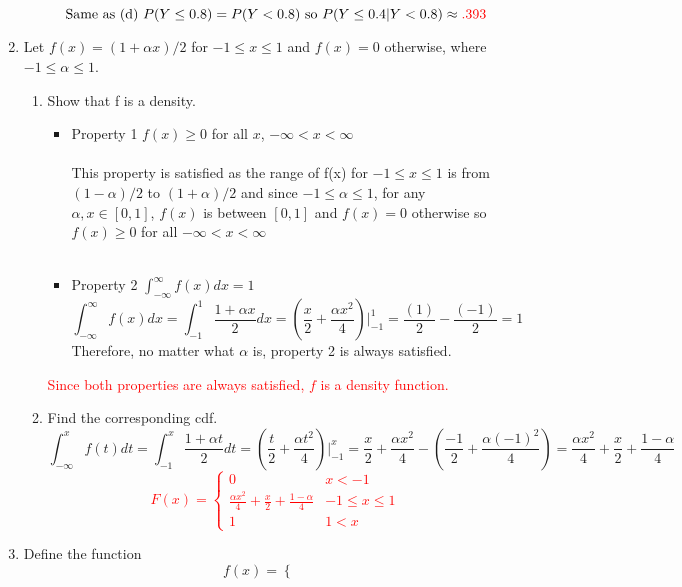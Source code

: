 \documentclass{article}
\begin{document}
\begin{enumerate}
\begin{enumerate}
        \[\text{Same as (d) }P(Y \leq 0.8)=P(Y < 0.8)\text{ so } P(Y \leq 0.4|Y < 0.8) \approx\textcolor{red}{.393} \]
    \end{enumerate}
\pagebreak
    \item Let $f(x) = (1 + \alpha x)/2$ for $-1 \leq x \leq 1$ and $f(x) = 0$ otherwise, where $-1 \leq \alpha \leq 1$.
    \begin{enumerate}
        \item Show that f is a density.
        \begin{itemize}
            \item[]Property 1 $f(x) \geq 0$ for all $x$, $-\infty < x < \infty$\\\\
            This property is satisfied as the range of f(x) for $-1 \leq x \leq 1$ is from $(1-\alpha)/2$ to $(1+\alpha)/2$ and since $-1 \leq \alpha \leq 1$, for any $\alpha, x \in [0,1]$, $f(x)$ is between $[0,1]$ and $f(x)=0$ otherwise so $f(x) \geq 0$ for all $-\infty < x < \infty$\\\\
            \item[]Property 2 $\int_{-\infty}^{\infty}f(x)dx=1$
            \[\int_{-\infty}^{\infty}f(x)dx=\int_{-1}^{1}\frac{1 + \alpha x}{2}dx=(\frac{x}{2}+\frac{\alpha x^2}{4})\Big|_{-1}^{1}=\frac{(1)}{2}-\frac{(-1)}{2}=1\]
            Therefore, no matter what $\alpha$ is, property 2 is always satisfied.
        \end{itemize}
        \textcolor{red}{Since both properties are always satisfied, $f$ is a density function.}
        \item Find the corresponding cdf.
        \[
            \int_{-\infty}^{x}f(t)dt=\int_{-1}^{x}\frac{1 + \alpha t}{2}dt=(\frac{t}{2}+\frac{\alpha t^2}{4})\Big|_{-1}^{x}=\frac{x}{2}+\frac{\alpha x^2}{4}-(\frac{-1}{2}+\frac{\alpha (-1)^2}{4})
            =\frac{\alpha x^2}{4}+\frac{x}{2}+\frac{1-\alpha}{4}
        \]
        \textcolor{red}{
        \[
        F(x)=
        \begin{cases}
            0 & x < -1\\
            \frac{\alpha x^2}{4}+\frac{x}{2}+\frac{1-\alpha}{4} & -1 \leq x \leq 1\\
            1 & 1 < x
        \end{cases}
        \]
        }
    \end{enumerate}
    \item Define the function
    \[
    f(x) =
    \begin{cases}

\end{cases}\]
\end{enumerate}
\end{document}

